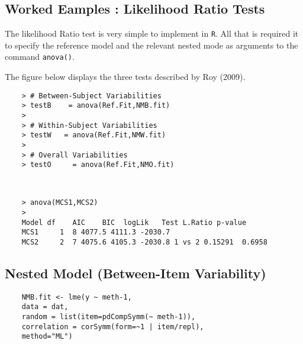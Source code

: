\documentclass[12pt, a4paper]{article}
\theoremstyle{plain}
\theoremstyle{definition}
\theoremstyle{remark}
\begin{document}
\subsection{Worked Eamples : Likelihood Ratio Tests}


The likelihood Ratio test is very simple to implement in \texttt{R}. All that is required it to specify the reference model and the relevant nested mode as arguments to the command \texttt{anova()}.

The figure below displays the three tests described by Roy (2009).

\begin{framed}
	\begin{verbatim}
	> # Between-Subject Variabilities
	> testB    = anova(Ref.Fit,NMB.fit) 
	>         
	> # Within-Subject Variabilities                
	> testW   = anova(Ref.Fit,NMW.fit) 
	>                       
	> # Overall Variabilities
	> testO     = anova(Ref.Fit,NMO.fit)                        
	
	
	\end{verbatim}
\end{framed}
\begin{framed}   
	\begin{verbatim}
	> anova(MCS1,MCS2)
	>
	Model df    AIC    BIC  logLik   Test L.Ratio p-value
	MCS1     1  8 4077.5 4111.3 -2030.7
	MCS2     2  7 4075.6 4105.3 -2030.8 1 vs 2 0.15291  0.6958
	\end{verbatim}
\end{framed}

\subsection{Nested Model (Between-Item Variability)}
\begin{framed}
	\begin{verbatim}
	NMB.fit <- lme(y ~ meth-1, 
	data = dat, 
	random = list(item=pdCompSymm(~ meth-1)),
	correlation = corSymm(form=~1 | item/repl), 
	method="ML")
	\end{verbatim}
\end{framed}



\end{document}
